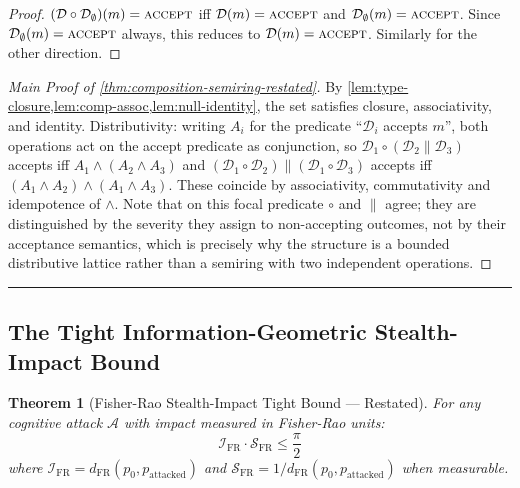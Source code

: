 \documentclass[
]{article}
\newtheorem{theorem}{Theorem}[section]
\begin{document}
\begin{proof}
$(\mathcal{D} \circ \mathcal{D}_\emptyset)(m) = \textsc{accept}$ iff $\mathcal{D}(m) = \textsc{accept}$ and $\mathcal{D}_\emptyset(m) = \textsc{accept}$. Since $\mathcal{D}_\emptyset(m) = \textsc{accept}$ always, this reduces to $\mathcal{D}(m) = \textsc{accept}$. Similarly for the other direction.
\end{proof}

\begin{proof}[Main Proof of \cref{thm:composition-semiring-restated}]
By \cref{lem:type-closure,lem:comp-assoc,lem:null-identity}, the set satisfies closure, associativity, and identity. Distributivity: writing $A_i$ for the predicate ``$\mathcal{D}_i$ accepts $m$'', both operations act on the accept predicate as conjunction, so $\mathcal{D}_1 \circ (\mathcal{D}_2 \parallel \mathcal{D}_3)$ accepts iff $A_1 \land (A_2 \land A_3)$ and $(\mathcal{D}_1 \circ \mathcal{D}_2) \parallel (\mathcal{D}_1 \circ \mathcal{D}_3)$ accepts iff $(A_1 \land A_2) \land (A_1 \land A_3)$. These coincide by associativity, commutativity and idempotence of $\land$. Note that on this focal predicate $\circ$ and $\parallel$ agree; they are distinguished by the severity they assign to non-accepting outcomes, not by their acceptance semantics, which is precisely why the structure is a bounded distributive lattice rather than a semiring with two independent operations.
\end{proof}

\begin{center}\rule{0.5\linewidth}{0.5pt}\end{center}

\subsection{The Tight Information-Geometric Stealth-Impact
Bound}\label{sec:thm-geometric-bound}

\begin{theorem}[Fisher-Rao Stealth-Impact Tight Bound --- Restated]
\label{thm:fr-bound-restated}
For any cognitive attack $\mathcal{A}$ with impact measured in Fisher-Rao units:
\begin{equation}
\label{eq:fr-bound-restated}
\mathcal{I}_{\mathrm{FR}} \cdot \mathcal{S}_{\mathrm{FR}} \leq \frac{\pi}{2}
\end{equation}
where $\mathcal{I}_{\mathrm{FR}} = d_{\mathrm{FR}}(p_0, p_{\text{attacked}})$ and $\mathcal{S}_{\mathrm{FR}} = 1/d_{\mathrm{FR}}(p_0, p_{\text{attacked}})$ when measurable.
\end{theorem}
\end{document}
